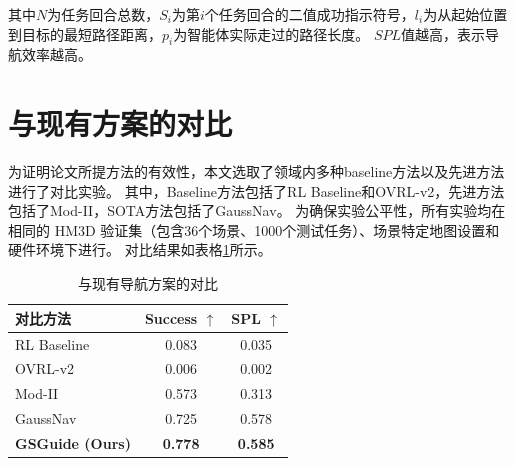其中$N$为任务回合总数，$S_i$为第$i$个任务回合的二值成功指示符号，$l_i$为从起始位置到目标的最短路径距离，$p_i$为智能体实际走过的路径长度。
$SPL$值越高，表示导航效率越高。



\section{与现有方案的对比}
为证明论文所提方法的有效性，本文选取了领域内多种baseline方法以及先进方法进行了对比实验。
其中，Baseline方法包括了RL Baseline\cite{krantz2022instance}和OVRL-v2\cite{yadav2023ovrl}，先进方法包括了Mod-II\cite{krantz2023navigating}，SOTA方法包括了GaussNav\cite{gaussnav}。
为确保实验公平性，所有实验均在相同的 HM3D 验证集（包含36个场景、1000个测试任务）、场景特定地图设置和硬件环境下进行。
对比结果如表格\ref{tab:hm3d_performance}所示。
\begin{table}[htbp]
\centering
\caption{与现有导航方案的对比}
\begin{tabular}{lcc}
\toprule
对比方法 & Success $\uparrow$ & SPL $\uparrow$ \\
\midrule
RL Baseline \cite{krantz2022instance} & 0.083 & 0.035 \\
OVRL-v2 \cite{yadav2023ovrl}  & 0.006 & 0.002 \\
\midrule
Mod-II\cite{krantz2023navigating} & 0.573 & 0.313 \\
\midrule
GaussNav \cite{gaussnav} & 0.725 & 0.578 \\
\textbf{GSGuide (Ours)} & \textbf{0.778} & \textbf{0.585} \\
\bottomrule
\end{tabular}
\label{tab:hm3d_performance}
\end{table}



